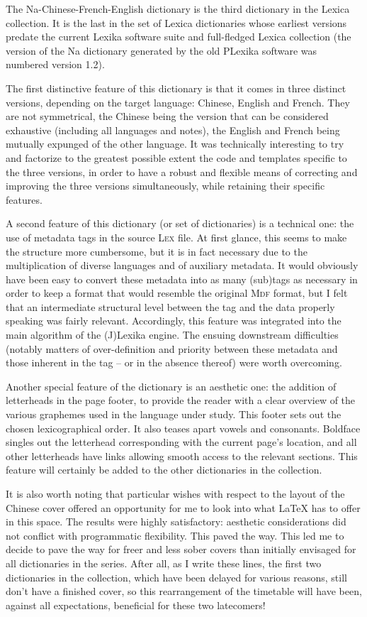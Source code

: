 The Na-Chinese-French-English dictionary is the third dictionary in the Lexica collection. It is the last in the set of Lexica dictionaries whose earliest versions predate the current Lexika software suite and full-fledged Lexica collection (the version of the Na dictionary generated by the old PLexika software was numbered version 1.2).

The first distinctive feature of this dictionary is that it comes in three distinct versions, depending on the target language: Chinese, English and French. They are not symmetrical, the Chinese being the version that can be considered exhaustive (including all languages and notes), the English and French being mutually expunged of the other language. It was technically interesting to try and factorize to the greatest possible extent the code and templates specific to the three versions, in order to have a robust and flexible means of correcting and improving the three versions simultaneously, while retaining their specific features.

A second feature of this dictionary (or set of dictionaries) is a technical one: the use of metadata tags in the source \textsc{Lex} file. At first glance, this seems to make the structure more cumbersome, but it is in fact necessary due to the multiplication of diverse languages and of auxiliary metadata. It would obviously have been easy to convert these metadata into as many (sub)tags as necessary in order to keep a format that would resemble the original \textsc{Mdf} format, but I felt that an intermediate structural level between the tag and the data properly speaking was fairly relevant. Accordingly, this feature was integrated into the main algorithm of the (J)Lexika engine. The ensuing downstream difficulties (notably matters of over-definition and priority between these metadata and those inherent in the tag – or in the absence thereof) were worth overcoming.

Another special feature of the dictionary is an aesthetic one: the addition of letterheads in the page footer, to provide the reader with a clear overview of the various graphemes used in the language under study. This footer sets out the chosen lexicographical order. It also teases apart vowels and consonants. Boldface singles out the letterhead corresponding with the current page's location, and all other letterheads have links allowing smooth access to the relevant sections. This feature will certainly be added to the other dictionaries in the collection.

It is also worth noting that particular wishes with respect to the layout of the Chinese cover offered an opportunity for me to look into what \LaTeX{} has to offer in this space. The results were highly satisfactory: aesthetic considerations did not conflict with programmatic flexibility. This paved the way. This led me to decide to pave the way for freer and less sober covers than initially envisaged for all dictionaries in the series. After all, as I write these lines, the first two dictionaries in the collection, which have been delayed for various reasons, still don't have a finished cover, so this rearrangement of the timetable will have been, against all expectations, beneficial for these two latecomers!

